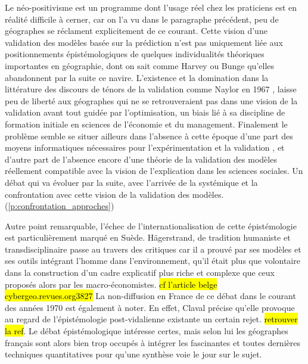
Le néo-positivisme est un programme dont l'usage réel chez les praticiens est en réalité difficile à cerner, car on l'a vu dans le paragraphe précédent, peu de géographes se réclament explicitement de ce courant. Cette vision d'une validation des modèles basée sur la prédiction n'est pas uniquement liée aux positionnements épistémologiques de quelques individualités théoriques importantes en géographie, dont on sait comme Harvey ou Bunge qu'elles abandonnent par la suite ce navire.  L'existence et la domination dans la littérature des discours de ténors de la validation comme Naylor en 1967 \autocite{Naylor1967}, laisse peu de liberté aux géographes qui ne se retrouveraient pas dans une vision de la validation avant tout guidée par l'optimisation, un biais lié à sa discipline de formation initiale en sciences de l'économie et du management. Finalement le problème semble se situer ailleurs dans l'absence à cette époque d'une part des moyens informatiques nécessaires pour l'expérimentation et la validation \autocite{Haggett1969, Marble1972}, et d'autre part de l'absence encore d'une théorie de la validation des modèles réellement compatible avec la vision de l'explication dans les sciences sociales. Un débat qui va évoluer par la suite, avec l'arrivée de la systémique et la confrontation avec cette vision de la validation des modèles. (\ref{p:confrontation_approches})

Autre point remarquable, l'échec de l'internationalisation de cette épistémologie est particulièrement marqué en Suède. Hägerstrand, de tradition humaniste et transdisciplinaire \autocite{Bailly2000} passe au travers des critiques car il a prouvé par ses modèles et ses outils intégrant l'homme dans l'environnement, qu'il était plus que volontaire dans la construction d'un cadre explicatif plus riche et complexe que ceux proposés alors par les macro-économistes. \hl{cf l'article belge cybergeo.revues.org\/3827} La non-diffusion en France de ce débat dans le courant des années 1970 est également à noter. En effet, Claval précise qu'elle provoque au regard de l'épistémologie post-vidalienne existante un certain rejet. \hl{retrouver la ref}. Le débat épistémologique intéresse certes, mais selon lui les géographes français sont alors bien trop occupés à intégrer les fascinantes et toutes dernières techniques quantitatives pour qu'une synthèse voie le jour sur le sujet.\autocite[27-29]{Claval2003}

